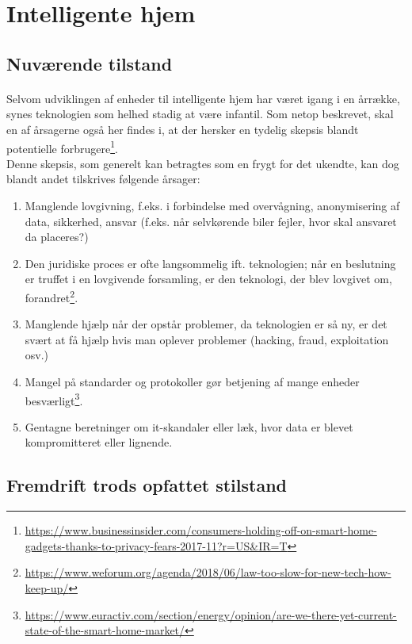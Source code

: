 \documentclass{article}
\begin{document}
\section{Intelligente hjem}
\subsection{Nuværende tilstand}
\paragraph{}
Selvom udviklingen af enheder til intelligente hjem har været igang i en årrække, synes teknologien som helhed stadig at være infantil.
Som netop beskrevet, skal en af årsagerne også her findes i, at der hersker en tydelig skepsis blandt potentielle forbrugere\footnote{\url{https://www.businessinsider.com/consumers-holding-off-on-smart-home-gadgets-thanks-to-privacy-fears-2017-11?r=US\&IR=T}}.\\
Denne skepsis, som generelt kan betragtes som en frygt for det ukendte, kan dog blandt andet tilskrives følgende årsager:
\begin{enumerate}
    \item Manglende lovgivning, f.eks. i forbindelse med overvågning, anonymisering af data, sikkerhed, ansvar (f.eks. når selvkørende biler fejler, hvor skal ansvaret da placeres?)
    \item Den juridiske proces er ofte langsommelig ift. teknologien; når en beslutning er truffet i en lovgivende forsamling, er den teknologi, der blev lovgivet om, forandret\footnote{\url{https://www.weforum.org/agenda/2018/06/law-too-slow-for-new-tech-how-keep-up/}}.
    \item Manglende hjælp når der opstår problemer, da teknologien er så ny, er det svært at få hjælp hvis man oplever problemer (hacking, fraud, exploitation osv.)
    \item Mangel på standarder og protokoller gør betjening af mange enheder besværligt\footnote{\url{https://www.euractiv.com/section/energy/opinion/are-we-there-yet-current-state-of-the-smart-home-market/}}.
    \item Gentagne beretninger om it-skandaler eller læk, hvor data er blevet kompromitteret eller lignende.
\end{enumerate} 
\subsection{Fremdrift trods opfattet stilstand}
\end{document}
